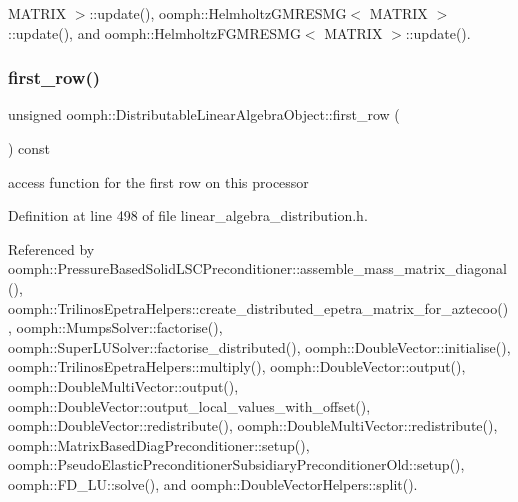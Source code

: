 M\+A\+T\+R\+I\+X $>$\+::update(), oomph\+::\+Helmholtz\+G\+M\+R\+E\+S\+M\+G$<$ M\+A\+T\+R\+I\+X $>$\+::update(), and oomph\+::\+Helmholtz\+F\+G\+M\+R\+E\+S\+M\+G$<$ M\+A\+T\+R\+I\+X $>$\+::update().

\mbox{\label{classoomph_1_1DistributableLinearAlgebraObject_ab00a3919b8634c698749f14a4d92947d}} 
\subsubsection{\texorpdfstring{first\+\_\+row()}{first\_row()}\hspace{0.1cm}{\footnotesize\ttfamily [1/2]}}
{\footnotesize\ttfamily unsigned oomph\+::\+Distributable\+Linear\+Algebra\+Object\+::first\+\_\+row (\begin{DoxyParamCaption}{ }\end{DoxyParamCaption}) const\hspace{0.3cm}{\ttfamily [inline]}}



access function for the first row on this processor 



Definition at line 498 of file linear\+\_\+algebra\+\_\+distribution.\+h.



Referenced by oomph\+::\+Pressure\+Based\+Solid\+L\+S\+C\+Preconditioner\+::assemble\+\_\+mass\+\_\+matrix\+\_\+diagonal(), oomph\+::\+Trilinos\+Epetra\+Helpers\+::create\+\_\+distributed\+\_\+epetra\+\_\+matrix\+\_\+for\+\_\+aztecoo(), oomph\+::\+Mumps\+Solver\+::factorise(), oomph\+::\+Super\+L\+U\+Solver\+::factorise\+\_\+distributed(), oomph\+::\+Double\+Vector\+::initialise(), oomph\+::\+Trilinos\+Epetra\+Helpers\+::multiply(), oomph\+::\+Double\+Vector\+::output(), oomph\+::\+Double\+Multi\+Vector\+::output(), oomph\+::\+Double\+Vector\+::output\+\_\+local\+\_\+values\+\_\+with\+\_\+offset(), oomph\+::\+Double\+Vector\+::redistribute(), oomph\+::\+Double\+Multi\+Vector\+::redistribute(), oomph\+::\+Matrix\+Based\+Diag\+Preconditioner\+::setup(), oomph\+::\+Pseudo\+Elastic\+Preconditioner\+Subsidiary\+Preconditioner\+Old\+::setup(), oomph\+::\+F\+D\+\_\+\+L\+U\+::solve(), and oomph\+::\+Double\+Vector\+Helpers\+::split().

